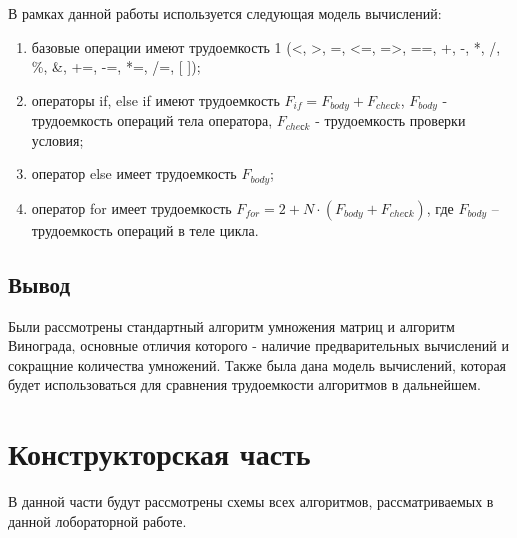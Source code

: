 \documentclass[a4paper, 14pt]{article}
\begin{document}
			В рамках данной работы используется следующая модель вычислений:\\
			\begin{enumerate}
  				\item базовые операции имеют трудоемкость 1 (<, >, =, <=, =>, ==, +, -, *, /, \%, \&, +=, -=, *=, /=,  [ ]);\\
				\item операторы if, else if имеют трудоемкость $F_{if} = F_{body} + F_{cheсk}$,  $F_{body}$ - трудоемкость операций тела оператора,  $F_{cheсk}$ - трудоемкость проверки условия;\\
				\item оператор else имеет трудоемкость $F_{body}$;\\
				\item оператор for имеет трудоемкость  $F_{for} = 2 + N \cdot (F_{body} + F_{cheсk})$, где $F_{body}$ – трудоемкость операций в теле цикла.\\
\end{enumerate}
		

    \subsection{Вывод}
    Были рассмотрены стандартный алгоритм умножения матриц и алгоритм Винограда, основные отличия которого - наличие предварительных вычислений и сокращние количества умножений. Также была дана модель вычислений, которая будет использоваться для сравнения трудоемкости алгоритмов в дальнейшем.\\
     	\newpage
        \section{Конструкторская часть}
        
		В данной части будут рассмотрены схемы всех алгоритмов, рассматриваемых в данной лобораторной работе. \\
\end{document}
